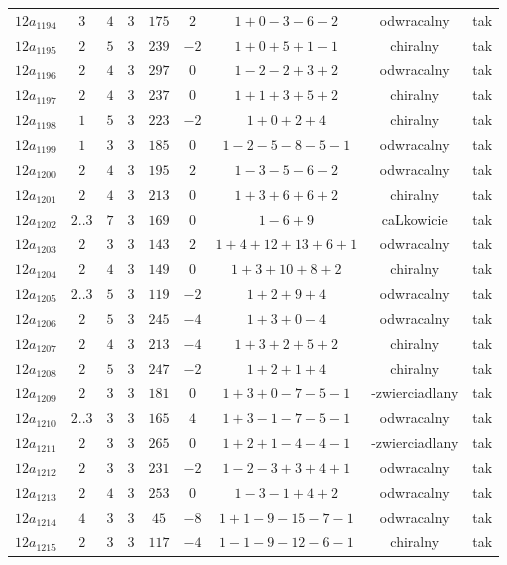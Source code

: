 \begin{longtable}{ccccccccc}
$12a_{1194}$ & $3$ & $4$ & $3$ & $175$ & $2$ & $1+0-3-6-2$ & odwracalny & tak \\
$12a_{1195}$ & $2$ & $5$ & $3$ & $239$ & $-2$ & $1+0+5+1-1$ & chiralny & tak \\
$12a_{1196}$ & $2$ & $4$ & $3$ & $297$ & $0$ & $1-2-2+3+2$ & odwracalny & tak \\
$12a_{1197}$ & $2$ & $4$ & $3$ & $237$ & $0$ & $1+1+3+5+2$ & chiralny & tak \\
$12a_{1198}$ & $1$ & $5$ & $3$ & $223$ & $-2$ & $1+0+2+4$ & chiralny & tak \\
$12a_{1199}$ & $1$ & $3$ & $3$ & $185$ & $0$ & $1-2-5-8-5-1$ & odwracalny & tak \\
$12a_{1200}$ & $2$ & $4$ & $3$ & $195$ & $2$ & $1-3-5-6-2$ & odwracalny & tak \\
$12a_{1201}$ & $2$ & $4$ & $3$ & $213$ & $0$ & $1+3+6+6+2$ & chiralny & tak \\
$12a_{1202}$ & $2..3$ & $7$ & $3$ & $169$ & $0$ & $1-6+9$ & caLkowicie & tak \\
$12a_{1203}$ & $2$ & $3$ & $3$ & $143$ & $2$ & $1+4+12+13+6+1$ & odwracalny & tak \\
$12a_{1204}$ & $2$ & $4$ & $3$ & $149$ & $0$ & $1+3+10+8+2$ & chiralny & tak \\
$12a_{1205}$ & $2..3$ & $5$ & $3$ & $119$ & $-2$ & $1+2+9+4$ & odwracalny & tak \\
$12a_{1206}$ & $2$ & $5$ & $3$ & $245$ & $-4$ & $1+3+0-4$ & odwracalny & tak \\
$12a_{1207}$ & $2$ & $4$ & $3$ & $213$ & $-4$ & $1+3+2+5+2$ & chiralny & tak \\
$12a_{1208}$ & $2$ & $5$ & $3$ & $247$ & $-2$ & $1+2+1+4$ & chiralny & tak \\
$12a_{1209}$ & $2$ & $3$ & $3$ & $181$ & $0$ & $1+3+0-7-5-1$ & -zwierciadlany & tak \\
$12a_{1210}$ & $2..3$ & $3$ & $3$ & $165$ & $4$ & $1+3-1-7-5-1$ & odwracalny & tak \\
$12a_{1211}$ & $2$ & $3$ & $3$ & $265$ & $0$ & $1+2+1-4-4-1$ & -zwierciadlany & tak \\
$12a_{1212}$ & $2$ & $3$ & $3$ & $231$ & $-2$ & $1-2-3+3+4+1$ & odwracalny & tak \\
$12a_{1213}$ & $2$ & $4$ & $3$ & $253$ & $0$ & $1-3-1+4+2$ & odwracalny & tak \\
$12a_{1214}$ & $4$ & $3$ & $3$ & $45$ & $-8$ & $1+1-9-15-7-1$ & odwracalny & tak \\
$12a_{1215}$ & $2$ & $3$ & $3$ & $117$ & $-4$ & $1-1-9-12-6-1$ & chiralny & tak \\

\end{longtable}
